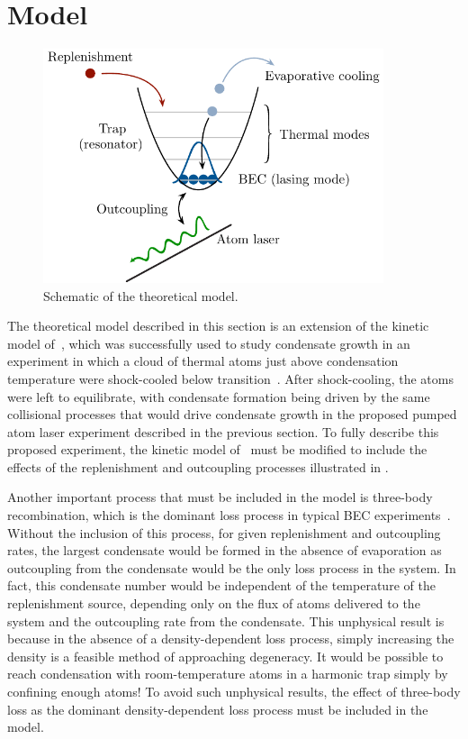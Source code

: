 \section{Model}
\label{KineticTheory:Model}

\begin{figure}
    \centering
        \includegraphics[width=10cm]{QKTModel2}
    \caption{Schematic of the theoretical model.}
    \label{KineticTheory:QKTModel}
\end{figure}

The theoretical model described in this section is an extension of the kinetic model of~\citet{Bijlsma:2000}, which was successfully used to study condensate growth in an experiment in which a cloud of thermal atoms just above condensation temperature were shock-cooled below transition~\citep{Miesner:1998}.  After shock-cooling, the atoms were left to equilibrate, with condensate formation being driven by the same collisional processes that would drive condensate growth in the proposed pumped atom laser experiment described in the previous section.  To fully describe this proposed experiment, the kinetic model of~\citeauthor{Bijlsma:2000} must be modified to include the effects of the replenishment and outcoupling processes illustrated in . 

Another important process that must be included in the model is three-body recombination, which is the dominant loss process in typical BEC experiments~\citep{Burt:1997fk,Soding:1999}. Without the inclusion of this process, for given replenishment and outcoupling rates, the largest condensate would be formed in the absence of evaporation as outcoupling from the condensate would be the only loss process in the system. In fact, this condensate number would be independent of the temperature of the replenishment source, depending only on the flux of atoms delivered to the system and the outcoupling rate from the condensate. This unphysical result is because in the absence of a density-dependent loss process, simply increasing the density is a feasible method of approaching degeneracy. It would be possible to reach condensation with room-temperature atoms in a harmonic trap simply by confining enough atoms! To avoid such unphysical results, the effect of three-body loss as the dominant density-dependent loss process must be included in the model.

